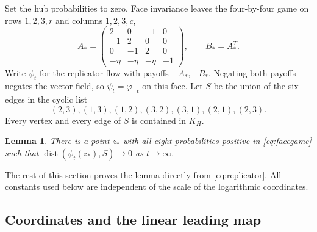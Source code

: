 \documentclass[11pt,a4paper]{article}
\numberwithin{equation}{section}
\newtheorem{lemma}[theorem]{Lemma}
\theoremstyle{definition}
\DeclareMathOperator{\dist}{dist}
\begin{document}
Set the hub probabilities to zero. Face invariance leaves the
four-by-four game on rows \(1,2,3,r\) and columns \(1,2,3,c\),
\begin{equation}\label{eq:facegame}
 A_* =\begin{pmatrix}
 2&0&-1&0\\-1&2&0&0\\0&-1&2&0\\
 -\eta&-\eta&-\eta&-1
 \end{pmatrix},\qquad B_*=A_*^T.
\end{equation}
Write \(\psi_t\) for the replicator flow with payoffs
\(-A_*,-B_*\). Negating both payoffs negates the vector field, so
\(\psi_t=\varphi_{-t}\) on this face.
Let \(S\) be the union of the six edges in the cyclic list
\begin{equation}\label{eq:cycle}
 (2,3),(1,3),(1,2),(3,2),(3,1),(2,1),(2,3).
\end{equation}
Every vertex and every edge of \(S\) is contained in \(K_H\).

\begin{lemma}\label{lem:orbit}
There is a point \(z_*\) with all eight probabilities positive in
\eqref{eq:facegame} such that
\(\dist(\psi_t(z_*),S)\to0\) as \(t\to\infty\).
\end{lemma}

The rest of this section proves the lemma directly from
\eqref{eq:replicator}. All constants used below are independent of
the scale of the logarithmic coordinates.

\subsection{Coordinates and the linear leading map}
\end{document}
